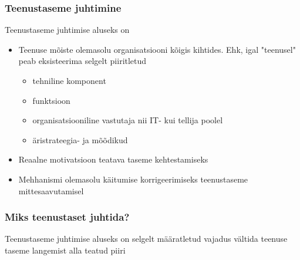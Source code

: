 \begin{frame}[fragile]
  \frametitle{Teenustaseme juhtimine}
	Teenustaseme juhtimise aluseks on 
		\begin{itemize}
			\item Teenuse mõiste olemasolu organisatsiooni kõigis kihtides. Ehk, igal "teenusel" peab eksisteerima selgelt piiritletud
			\begin{itemize}
				\item tehniline komponent
				\item funktsioon
				\item organisatsiooniline vastutaja nii IT- kui tellija poolel
				\item äristrateegia- ja mõõdikud
			\end{itemize}		
			\item Reaalne motivatsioon teatava taseme kehtestamiseks
			\item Mehhanismi olemasolu käitumise korrigeerimiseks teenustaseme mittesaavutamisel
		\end{itemize}		
\end{frame}

\begin{frame}[fragile]
  \frametitle{Miks teenustaset juhtida?}
	\begin{center}
		Teenustaseme juhtimise aluseks on selgelt määratletud vajadus vältida teenuse taseme langemist alla teatud piiri
	\end{center}
\end{frame}


